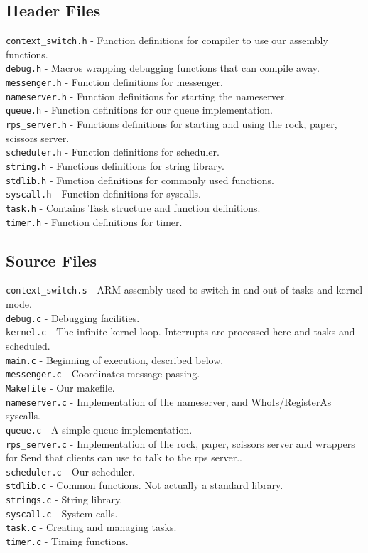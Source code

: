 \documentclass[letterpaper]{article}
\begin{document}
\subsection{Header Files}
\verb!context_switch.h! - Function definitions for compiler to use our assembly functions.\\
\verb!debug.h! - Macros wrapping debugging functions that can compile away.\\
\verb!messenger.h! - Function definitions for messenger.\\
\verb!nameserver.h! - Function definitions for starting the nameserver.\\
\verb!queue.h! - Function definitions for our queue implementation.\\
\verb!rps_server.h! - Functions definitions for starting and using the rock, paper, scissors server. \\
\verb!scheduler.h! - Function definitions for scheduler.\\
\verb!string.h! - Functions definitions for string library.\\
\verb!stdlib.h! - Function definitions for commonly used functions.\\
\verb!syscall.h! - Function definitions for syscalls.\\
\verb!task.h! - Contains Task structure and function definitions.\\
\verb!timer.h! - Function definitions for timer.\\

\subsection{Source Files}
\verb!context_switch.s! - ARM assembly used to switch in and out of tasks and kernel mode.\\
\verb!debug.c! - Debugging facilities.\\
\verb!kernel.c! - The infinite kernel loop. Interrupts are processed here and tasks and scheduled.\\
\verb!main.c! - Beginning of execution, described below.\\
\verb!messenger.c! - Coordinates message passing.\\
\verb!Makefile! - Our makefile.\\
\verb!nameserver.c! - Implementation of the nameserver, and WhoIs/RegisterAs syscalls.\\
\verb!queue.c! - A simple queue implementation.\\
\verb!rps_server.c! - Implementation of the rock, paper, scissors server and wrappers for Send that clients can use to talk to the rps server..\\
\verb!scheduler.c! - Our scheduler.\\
\verb!stdlib.c! - Common functions. Not actually a standard library.\\
\verb!strings.c! - String library.\\
\verb!syscall.c! - System calls.\\
\verb!task.c! - Creating and managing tasks.\\
\verb!timer.c! - Timing functions.\\
\end{document}

